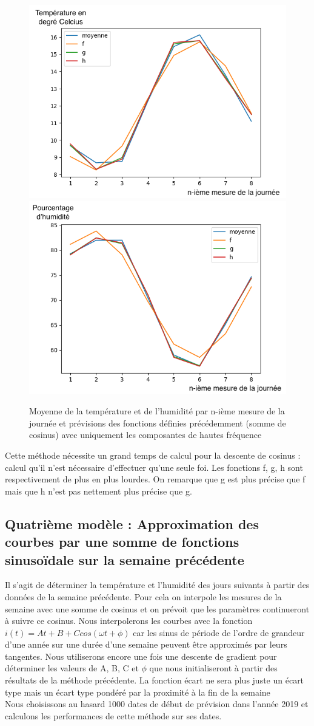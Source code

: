 \documentclass[11pt,a4paper]{article}
\begin{document}
\begin{figure} [H]
\centering
\includegraphics[width=0.48 \textwidth]{./imagesTIPE/CourbeJourneeT.png}\quad
\includegraphics[width=0.48 \textwidth]{./imagesTIPE/CourbeJourneeH.png}
\caption{\label{fig:190101Lolita} Moyenne de la température et de l'humidité par n-ième mesure de la journée et prévisions des fonctions définies précédemment (somme de cosinus) avec uniquement les composantes de hautes fréquence }
\end{figure}

Cette méthode nécessite un grand temps de calcul pour la descente de cosinus : calcul qu'il n'est nécessaire d'effectuer qu'une seule foi. Les fonctions f, g, h sont respectivement de plus en plus lourdes. On remarque que g est plus précise que f mais que h n'est pas nettement plus précise que g.



\subsection {Quatrième modèle : Approximation des courbes par une somme de fonctions sinusoïdale sur la semaine précédente }
Il s'agit de déterminer la température et l'humidité des jours suivants à partir des données de la semaine précédente. Pour cela on interpole les mesures de la semaine avec une somme de cosinus et on prévoit que les paramètres continueront à suivre ce cosinus. Nous interpolerons les courbes avec la fonction $i(t) = At + B + C cos  (\omega t + \phi)$  car les sinus de période de l'ordre de grandeur d'une année sur une durée  d'une semaine peuvent être approximés par leurs tangentes. Nous utiliserons encore une fois une descente de gradient pour déterminer les valeurs de A, B, C et $\phi$ que nous initialiseront à partir des résultats de la méthode précédente. La fonction écart ne sera plus juste un écart type mais un écart type pondéré par la proximité à la fin de la semaine \\
Nous choisissons au hasard 1000 dates de début de prévision dans l'année 2019 et calculons les performances de cette méthode sur ses dates.\\
\end{document}
